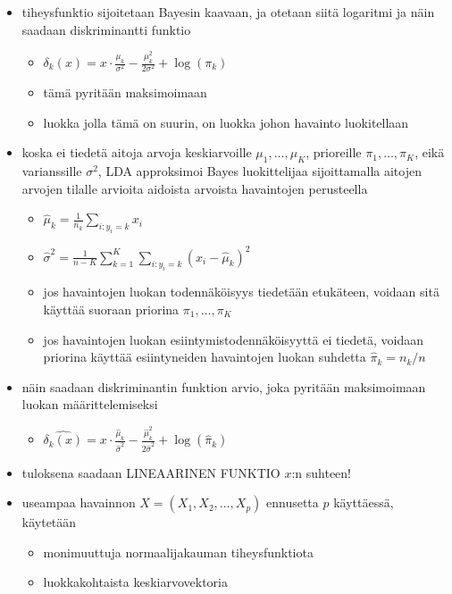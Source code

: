 \begin{itemize}
\begin{itemize}
    \end{itemize}
    \item tiheysfunktio sijoitetaan Bayesin kaavaan, ja otetaan siitä logaritmi ja näin saadaan diskriminantti funktio
    \begin{itemize}
        \item $\delta_k(x) = x \cdot \frac{\mu_k}{\sigma^2} - \frac{\mu^2_k}{2 \sigma^2} + \log(\pi_k)$
        \item tämä pyritään maksimoimaan
        \item luokka jolla tämä on suurin, on luokka johon havainto luokitellaan
    \end{itemize}
    \item koska ei tiedetä aitoja arvoja keskiarvoille $\mu_1, \dots, \mu_K$, prioreille $\pi_1, \dots, \pi_K$, eikä varianssille $\sigma^2$, LDA approksimoi Bayes luokittelijaa sijoittamalla aitojen arvojen tilalle arvioita aidoista arvoista havaintojen perusteella
    \begin{itemize}
        \item $\hat{\mu}_k = \frac{1}{n_k} \sum_{i:y_i = k} x_i$
        \item $\hat{\sigma}^2 = \frac{1}{n - K} \sum^K_{k=1} \sum_{i:y_i = k} (x_i - \hat{\mu}_k)^2$
        \item jos havaintojen luokan todennäköisyys tiedetään etukäteen, voidaan sitä käyttää suoraan priorina $\pi_1, \dots, \pi_K$ 
        \item jos havaintojen luokan esiintymistodennäköisyyttä ei tiedetä, voidaan priorina käyttää esiintyneiden havaintojen luokan suhdetta $\hat{\pi}_k = n_k / n$
    \end{itemize}
    \item näin saadaan diskriminantin funktion arvio, joka pyritään maksimoimaan luokan määrittelemiseksi
    \begin{itemize}
        \item $\hat{\delta_k(x)} = x \cdot \frac{\hat{\mu}_k}{\hat{\sigma}^2} - \frac{\hat{\mu}^2_k}{2 \hat{\sigma}^2} + \log(\hat{\pi}_k)$
    \end{itemize}
    \item tuloksena saadaan LINEAARINEN FUNKTIO $x$:n suhteen!
    \item useampaa havainnon $X = (X_1, X_2, \dots, X_p)$ ennusetta $p$ käyttäessä, käytetään
    \begin{itemize}
        \item monimuuttuja normaalijakauman tiheysfunktiota
        \item luokkakohtaista keskiarvovektoria

\end{itemize}
\end{itemize}
